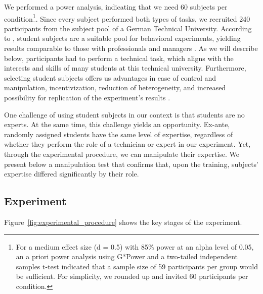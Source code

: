 \documentclass[msom,nonblindrev]{01 latex/class/informs3}
\begin{document}
We performed a power analysis, indicating that we need 60 subjects per condition\footnote{For a medium effect size (d = 0.5) with 85\% power at an alpha level of 0.05, an a priori power analysis using G*Power \citep{faul2009statistical} and a two-tailed independent samples t-test indicated that a sample size of 59 participants per group would be sufficient. For simplicity, we rounded up and invited 60 participants per condition.}. Since every subject performed both types of tasks, we recruited 240 participants from the subject pool of a German Technical University. According to \citet{exadaktylos2013experimental}, student subjects are a suitable pool for behavioral experiments, yielding results comparable to those with professionals and managers \citep{bolton2012managers, frechette2015}. As we will describe below, participants had to perform a technical task, which aligns with the interests and skills of many students at this technical university. Furthermore, selecting student subjects offers us advantages in ease of control and manipulation, incentivization, reduction of heterogeneity, and increased possibility for replication of the experiment's results \citep{katok2018designing}.

One challenge of using student subjects in our context is that students are no experts. At the same time, this challenge yields an opportunity. Ex-ante, randomly assigned students have the same level of expertise, regardless of whether they perform the role of a technician or expert in our experiment. Yet, through the experimental procedure, we can manipulate their expertise. We present below a manipulation test that confirms that, upon the training, subjects' expertise differed significantly by their role.

\subsection{Experiment}
Figure~\ref{fig:experimental_procedure} shows the key stages of the experiment. 
\end{document}
